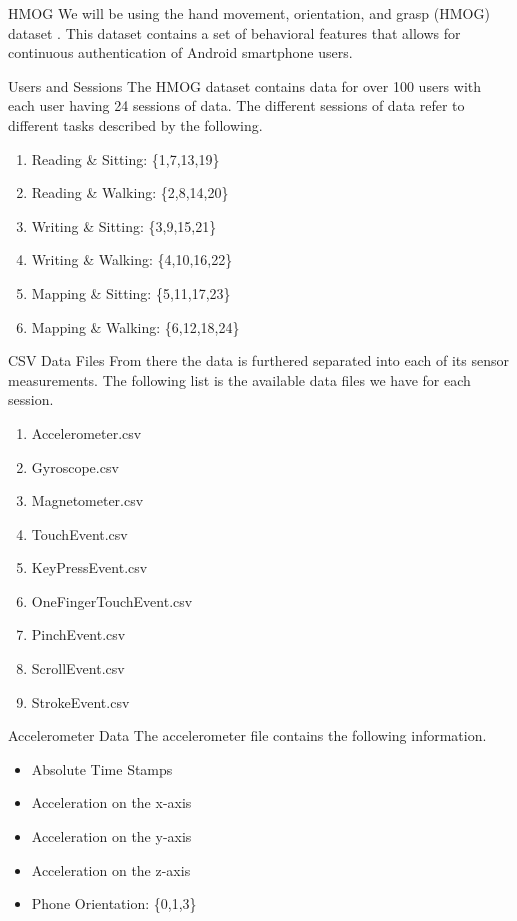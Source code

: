 \documentclass[10pt]{beamer}
\begin{document}
\begin{frame} {HMOG}
We will be using the hand movement, orientation, and
grasp (HMOG) dataset \cite{phone}. This dataset contains a set of behavioral features that allows for continuous authentication of Android smartphone users. 
\end{frame}

\begin{frame} {Users and Sessions}
The HMOG dataset contains data for over 100 users with each user having 24 sessions of data. The different sessions of data refer to different tasks described by the following.
\begin{enumerate}
\item Reading \& Sitting: \{1,7,13,19\}
\item Reading \& Walking: \{2,8,14,20\}
\item Writing \& Sitting: \{3,9,15,21\}
\item Writing \& Walking: \{4,10,16,22\}
\item Mapping \& Sitting: \{5,11,17,23\}
\item Mapping \& Walking: \{6,12,18,24\}
\end{enumerate}
\end{frame}

\begin{frame} {CSV Data Files}
From there the data is furthered separated into each of its sensor measurements. The following list is the available data files we have for each session. 
\begin{enumerate}
\item Accelerometer.csv
\item Gyroscope.csv
\item Magnetometer.csv
\item TouchEvent.csv
\item KeyPressEvent.csv
\item OneFingerTouchEvent.csv
\item PinchEvent.csv
\item ScrollEvent.csv
\item StrokeEvent.csv
\end{enumerate}
\end{frame}

\begin{frame} {Accelerometer Data}
The accelerometer file contains the following information.
\begin{itemize}
\item Absolute Time Stamps
\item Acceleration on the x-axis
\item Acceleration on the y-axis
\item Acceleration on the z-axis
\item Phone Orientation: \{0,1,3\}
\end{itemize}
\end{frame}
\end{document}
